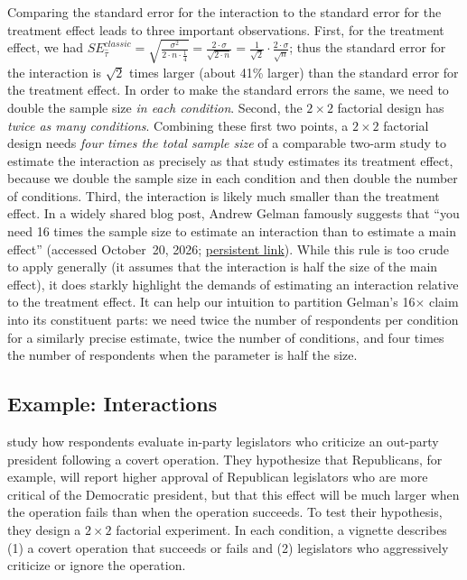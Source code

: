 \documentclass[12pt]{article}
\begin{document}
Comparing the standard error for the interaction to the standard error for the treatment effect leads to three important observations. 
First, for the treatment effect, we had $SE_{\widehat{\tau}}^{classic} = \sqrt{\frac{\sigma^{2}}{2 \cdot n \cdot \frac{1}{4}}} = \frac{2 \cdot \sigma}{\sqrt{2 \cdot n}} = \frac{1}{\sqrt{2}} \cdot \frac{2 \cdot \sigma}{\sqrt{n}}$; thus the standard error for the interaction is $\sqrt{2}$ times larger (about 41\% larger) than the standard error for the treatment effect. 
In order to make the standard errors the same, we need to double the sample size \textit{in each condition}.
Second, the $2 \times 2$ factorial design has \textit{twice as many conditions}.
Combining these first two points, a $2 \times 2$ factorial design needs \textit{four times the total sample size} of a comparable two-arm study to estimate the interaction as precisely as that study estimates its treatment effect, because we double the sample size in each condition and then double the number of conditions.
Third, the interaction is likely much smaller than the treatment effect.
In a widely shared blog post, Andrew Gelman famously suggests that ``you
need 16 times the sample size to estimate an interaction than to
estimate a main effect'' (accessed October~20, 2026; \href{https://web.archive.org/web/20260926051552/https://statmodeling.stat.columbia.edu/2018/03/15/need16/}{persistent link}).
While this rule is too crude to apply generally (it assumes that the interaction is half the size of the main effect), it does starkly highlight the demands of estimating an interaction relative to the treatment effect.
It can help our intuition to partition Gelman's 16$\times$ claim into its constituent parts: we need twice the number of respondents per condition for a similarly precise estimate, twice the number of conditions, and four times the number of respondents when the parameter is half the size.

\subsection*{Example: Interactions}

\citet{Robbins2024} study how respondents evaluate in-party legislators who criticize an out-party president following a covert operation.
They hypothesize that Republicans, for example, will report higher approval of Republican legislators who are more critical of the Democratic president, but that this effect will be much larger when the operation fails than when the operation succeeds.
To test their hypothesis, they design a $2 \times 2$ factorial experiment.
In each condition, a vignette describes (1) a covert operation that succeeds or fails and (2) legislators who aggressively criticize or ignore the operation.
\end{document}
